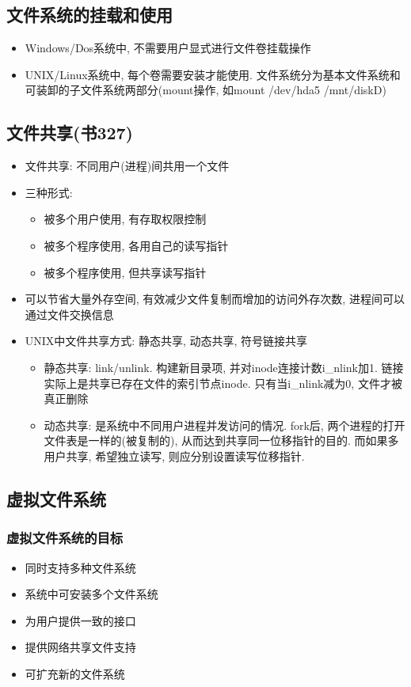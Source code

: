 \documentclass[a4paper, UTF8]{article}
\begin{document}
\subsection{文件系统的挂载和使用}
\begin{itemize}
\item Windows/Dos系统中, 不需要用户显式进行文件卷挂载操作
\item UNIX/Linux系统中, 每个卷需要安装才能使用. 文件系统分为基本文件系统和可装卸的子文件系统两部分(mount操作, 如mount /dev/hda5 /mnt/diskD)
\end{itemize}
\subsection{文件共享(书327)}
\begin{itemize}
\item 文件共享: 不同用户(进程)间共用一个文件
\item 三种形式:
	\begin{itemize}
	\item 被多个用户使用, 有存取权限控制
	\item 被多个程序使用, 各用自己的读写指针
	\item 被多个程序使用, 但共享读写指针
	\end{itemize}
\item 可以节省大量外存空间, 有效减少文件复制而增加的访问外存次数, 进程间可以通过文件交换信息
\item UNIX中文件共享方式: 静态共享, 动态共享, 符号链接共享
	\begin{itemize}
	\item 静态共享: link/unlink. 构建新目录项, 并对inode连接计数i\_nlink加1. 链接实际上是共享已存在文件的索引节点inode. 只有当i\_nlink减为0, 文件才被真正删除
	\item 动态共享: 是系统中不同用户进程并发访问的情况. fork后, 两个进程的打开文件表是一样的(被复制的), 从而达到共享同一位移指针的目的. 而如果多用户共享, 希望独立读写, 则应分别设置读写位移指针.
	\end{itemize}
\end{itemize}

\subsection{虚拟文件系统}
\subsubsection{虚拟文件系统的目标}
\begin{itemize}
\item 同时支持多种文件系统
\item 系统中可安装多个文件系统
\item 为用户提供一致的接口
\item 提供网络共享文件支持
\item 可扩充新的文件系统
\end{itemize}
\end{document}
